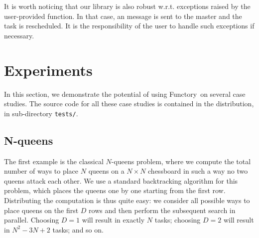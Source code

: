 \documentclass[tfpsymp,pagenumbers]{tfp07symp}
\newcommand{\functory}{\textsf{Functory}}
\begin{document}
It is worth noticing that our library is also robust w.r.t. exceptions
raised by the user-provided  function. In that case, an
 message is sent to the master and the task is
rescheduled. It is the responsibility of the user to handle such
exceptions if necessary.


\section{Experiments}\label{sec:experiments}

In this section, we demonstrate the potential of using \functory\ on
several case studies.
The source code for all these case studies is contained in the
distribution, in sub-directory \texttt{tests/}.

\subsection{N-queens}\label{sec:n-queens}

The first example is the classical $N$-queens problem, where we
compute the total number of ways to place $N$ queens on a $N\times N$
chessboard in such a way no two queens attack each other.
We use a standard backtracking algorithm for this problem, which
places the queens one by one starting from the first row.
Distributing the computation is thus quite easy: we consider all
possible ways to place queens on the first $D$ rows and then perform
the subsequent search in parallel. Choosing $D=1$ will result in
exactly $N$ tasks; choosing $D=2$ will result in $N^2-3N+2$ tasks; and
so on.
\end{document}
